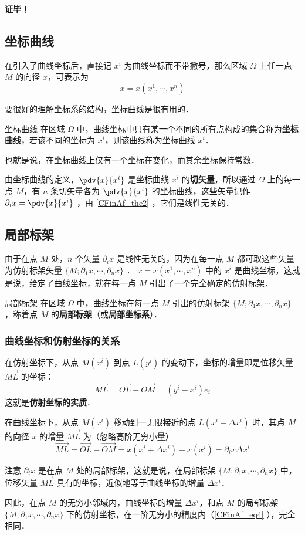 \textbf{证毕！}
\subsection{坐标曲线}
在引入了曲线坐标后，直接记 $x^i$ 为曲线坐标而不带撇号，那么区域 $\Omega$ 上任一点 $M$ 的向径 $x$，可表示为
\begin{equation}
x=x(x^1,\cdots,x^n)
\end{equation}

要很好的理解坐标系的结构，坐标曲线是很有用的．
\begin{definition}{坐标曲线}
在区域 $\Omega$ 中，曲线坐标中只有某一个不同的所有点构成的集合称为\textbf{坐标曲线}，若该不同的坐标为 $x^i$，则该曲线称为坐标曲线 $x^i$．
\end{definition}
也就是说，在坐标曲线上仅有一个坐标在变化，而其余坐标保持常数．

由坐标曲线的定义，$\pdv{x}{x^i}$ 是坐标曲线 $x^i$ 的\textbf{切矢量}，所以通过 $\Omega$ 上的每一点 $M$，有 $n$ 条切矢量各为 $\pdv{x}{x^i}$ 的坐标曲线，这些矢量记作 $\partial_i x=\pdv{x}{x^i}$ ，由 \autoref{CFinAf_the2} ，它们是线性无关的．
\subsection{局部标架}
由于在点 $M$ 处，$n$ 个矢量 $\partial_i x$ 是线性无关的，因为在每一点 $M$ 都可取这些矢量为仿射标架矢量 $\{M;\partial_1 x,\cdots,\partial_n x\}$ ． $x=x(x^1,\cdots,x^n)$ 中的 $x^i$ 是曲线坐标，这就是说，给定了曲线坐标，就在每一点 $M$ 引出了一个完全确定的仿射标架．
\begin{definition}{局部标架}
在区域 $\Omega$ 中，曲线坐标在每一点 $M$ 引出的仿射标架 $\{M;\partial_1 x,\cdots,\partial_n x\}$ ，称着点 $M$ 的\textbf{局部标架}（或\textbf{局部坐标系}）．
\end{definition} 
\subsubsection{曲线坐标和仿射坐标的关系}
在仿射坐标下，从点 $M(x^i)$ 到点 $L(y^i)$ 的变动下，坐标的增量即是位移矢量 $\overrightarrow{ML}$ 的坐标：
\begin{equation}
\overrightarrow{ML}=\overrightarrow{OL}-\overrightarrow{OM}=(y^i-x^i)e_i
\end{equation}
这就是\textbf{仿射坐标的实质}．

在曲线坐标下，从点 $M(x^i)$ 移动到一无限接近的点 $L(x^i+\Delta x^i)$ 时，其点 $M$ 的向径 $x$ 的增量 $\overrightarrow{ML}$ 为（忽略高阶无穷小量）
\begin{equation}\label{CFinAf_eq4}
\overrightarrow{ML}=\overrightarrow{OL}-\overrightarrow{OM}=x(x^i+\Delta x^i)-x(x^i)=\partial_i x\Delta x^i
\end{equation}

注意 $\partial_i x$ 是在点 $M$ 处的局部标架，这就是说，在局部标架 $\{M;\partial_1 x,\cdots,\partial_n x\}$ 中，位移矢量 $\overrightarrow{ML}$ 具有的坐标，近似地等于曲线坐标的增量 $\Delta x^i$．

因此，在点 $M$ 的无穷小邻域内，曲线坐标的增量 $\Delta x^i$，和点 $M$ 的局部标架 $\{M;\partial_1 x,\cdots,\partial_n x\}$ 下的仿射坐标，在一阶无穷小的精度内（\autoref{CFinAf_eq4} ），完全相同．